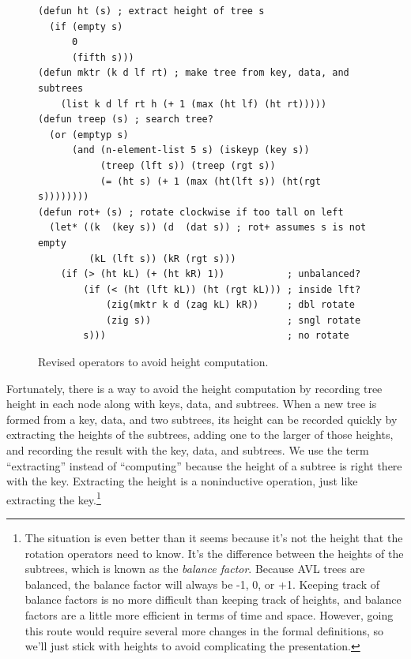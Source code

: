 \begin{figure}
\begin{center}
\begin{code}
\begin{verbatim}
(defun ht (s) ; extract height of tree s
  (if (empty s)
      0
      (fifth s)))
(defun mktr (k d lf rt) ; make tree from key, data, and subtrees
    (list k d lf rt h (+ 1 (max (ht lf) (ht rt)))))
(defun treep (s) ; search tree?
  (or (emptyp s)
      (and (n-element-list 5 s) (iskeyp (key s))
           (treep (lft s)) (treep (rgt s))
           (= (ht s) (+ 1 (max (ht(lft s)) (ht(rgt s))))))))
(defun rot+ (s) ; rotate clockwise if too tall on left
  (let* ((k  (key s)) (d  (dat s)) ; rot+ assumes s is not empty
         (kL (lft s)) (kR (rgt s)))
    (if (> (ht kL) (+ (ht kR) 1))           ; unbalanced?
        (if (< (ht (lft kL)) (ht (rgt kL))) ; inside lft?
            (zig(mktr k d (zag kL) kR))     ; dbl rotate
            (zig s))                        ; sngl rotate
        s)))                                ; no rotate
\end{verbatim}
\end{code}
\end{center}
\caption{Revised operators to avoid height computation.}
\label{defun:balance-factor}
\end{figure}

Fortunately, there is a way to avoid the
height computation
by recording tree height
in each node along with keys, data, and subtrees.
When a new tree is formed from a key, data, and two subtrees,
its height can be recorded quickly by extracting the heights of the
subtrees, adding one to the larger of those heights,
and recording the result with the key, data, and subtrees.
We use the term ``extracting'' instead of ``computing''
because the height of a subtree is right there with the key.
Extracting the height is a noninductive operation,
just like extracting the key.\footnote{The situation
is even better than it seems because
it's not the height that the rotation operators need to know.
It's the difference between the heights of the subtrees,
which is known as the \emph{balance factor}.
Because AVL trees are balanced,
the balance factor will always be
-1, 0, or +1.
Keeping track of balance factors is no more difficult
than keeping track of heights,
and balance factors are a little more
efficient in terms of time and space.
However, going this route would require several
more changes in the formal definitions,
so we'll just stick with heights to avoid complicating the presentation.}

